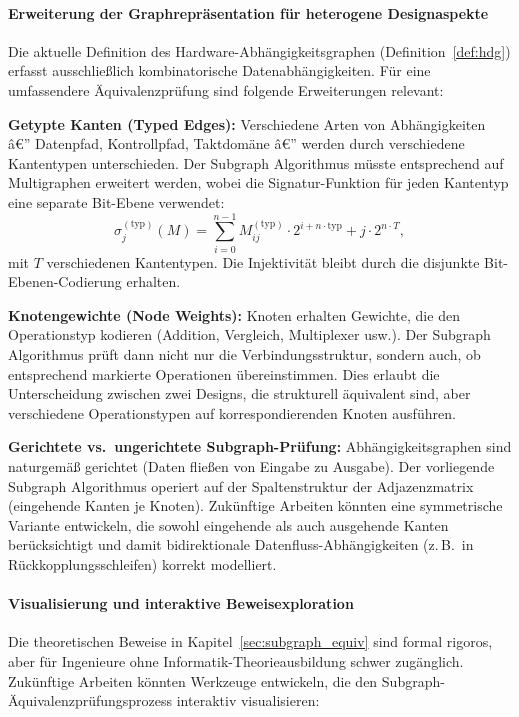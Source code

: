 ﻿\documentclass[12pt,a4paper]{report}
\begin{document}
\paragraph{Erweiterung der Graphrepräsentation für heterogene Designaspekte}

Die aktuelle Definition des Hardware-Abhängigkeitsgraphen (Definition~\ref{def:hdg})
erfasst ausschließlich kombinatorische Datenabhängigkeiten. Für eine umfassendere
Äquivalenzprüfung sind folgende Erweiterungen relevant:

\textbf{Getypte Kanten (Typed Edges):} Verschiedene Arten von Abhängigkeiten â€” Datenpfad,
Kontrollpfad, Taktdomäne â€” werden durch verschiedene Kantentypen unterschieden. Der
Subgraph Algorithmus müsste entsprechend auf Multigraphen erweitert werden, wobei
die Signatur-Funktion für jeden Kantentyp eine separate Bit-Ebene verwendet:
\[
\sigma_j^{(\text{typ})}(M) = \sum_{i=0}^{n-1} M_{ij}^{(\text{typ})} \cdot 2^{i + n \cdot \text{typ}} + j \cdot 2^{n \cdot T},
\]
mit $T$ verschiedenen Kantentypen. Die Injektivität bleibt durch die disjunkte
Bit-Ebenen-Codierung erhalten.

\textbf{Knotengewichte (Node Weights):} Knoten erhalten Gewichte, die den Operationstyp
kodieren (Addition, Vergleich, Multiplexer usw.). Der Subgraph Algorithmus prüft dann
nicht nur die Verbindungsstruktur, sondern auch, ob entsprechend markierte Operationen
übereinstimmen. Dies erlaubt die Unterscheidung zwischen zwei Designs, die strukturell
äquivalent sind, aber verschiedene Operationstypen auf korrespondierenden Knoten
ausführen.

\textbf{Gerichtete vs.\ ungerichtete Subgraph-Prüfung:} Abhängigkeitsgraphen sind
naturgemäß gerichtet (Daten fließen von Eingabe zu Ausgabe). Der vorliegende Subgraph
Algorithmus operiert auf der Spaltenstruktur der Adjazenzmatrix (eingehende Kanten je
Knoten). Zukünftige Arbeiten könnten eine symmetrische Variante entwickeln, die sowohl
eingehende als auch ausgehende Kanten berücksichtigt und damit bidirektionale
Datenfluss-Abhängigkeiten (z.\,B.\ in Rückkopplungsschleifen) korrekt modelliert.

\paragraph{Visualisierung und interaktive Beweisexploration}

Die theoretischen Beweise in Kapitel~\ref{sec:subgraph_equiv} sind formal rigoros,
aber für Ingenieure ohne Informatik-Theorieausbildung schwer zugänglich. Zukünftige
Arbeiten könnten Werkzeuge entwickeln, die den Subgraph-Äquivalenzprüfungsprozess
interaktiv visualisieren:
\end{document}
